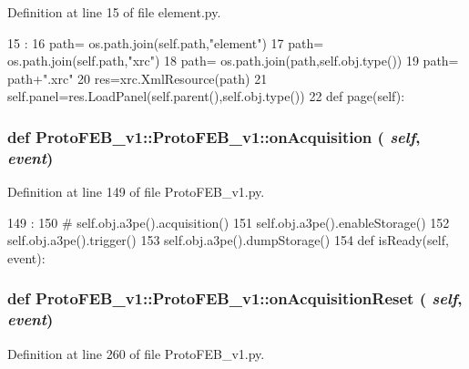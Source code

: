 Definition at line 15 of file element.py.


\begin{DoxyCode}
15                      :
16         path= os.path.join(self.path,"element")
17         path= os.path.join(self.path,"xrc")
18         path= os.path.join(path,self.obj.type())
19         path= path+".xrc"
20         res=xrc.XmlResource(path)
21         self.panel=res.LoadPanel(self.parent(),self.obj.type())
22             
    def page(self):
\end{DoxyCode}
\hypertarget{classProtoFEB__v1_1_1ProtoFEB__v1_a71c6d3a351a4aa0d39d1888b679466e7}{
\subsubsection[{onAcquisition}]{\setlength{\rightskip}{0pt plus 5cm}def ProtoFEB\_\-v1::ProtoFEB\_\-v1::onAcquisition ( {\em self}, \/   {\em event})}}
\label{classProtoFEB__v1_1_1ProtoFEB__v1_a71c6d3a351a4aa0d39d1888b679466e7}


Definition at line 149 of file ProtoFEB\_\-v1.py.


\begin{DoxyCode}
149                                   :
150 #        self.obj.a3pe().acquisition()
151         self.obj.a3pe().enableStorage()
152         self.obj.a3pe().trigger()
153         self.obj.a3pe().dumpStorage()
154 
    def isReady(self, event):
\end{DoxyCode}
\hypertarget{classProtoFEB__v1_1_1ProtoFEB__v1_a6cbdb15029b52e3af436692ee8723f1f}{
\subsubsection[{onAcquisitionReset}]{\setlength{\rightskip}{0pt plus 5cm}def ProtoFEB\_\-v1::ProtoFEB\_\-v1::onAcquisitionReset ( {\em self}, \/   {\em event})}}
\label{classProtoFEB__v1_1_1ProtoFEB__v1_a6cbdb15029b52e3af436692ee8723f1f}


Definition at line 260 of file ProtoFEB\_\-v1.py.



